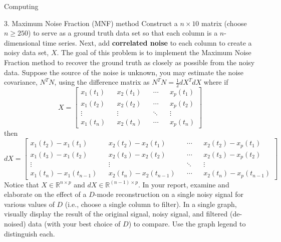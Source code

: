 \begin{section}{Computing}
\newpage
\begin{homeworkSection}{3. Maximum Noise Fraction (MNF) method}
Construct a $n \times 10$ matrix (choose $n \geq 250$) to serve as a ground truth data set so that each column is a
$n$-dimensional time series. Next, add \textbf{correlated noise} to each column to create a noisy data set, $X$. The
goal of this problem is to implement the Maximum Noise Fraction method to recover the ground truth as
closely as possible from the noisy data. Suppose the source of the noise is unknown, you may estimate
the noise covariance, $N^TN$, using the difference matrix as $N^T N = \frac{1}{2} dX^TdX$ where if
$$
    X = \begin{bmatrix}
        x_1(t_1)  &&  x_2(t_1) && \cdots && x_p(t_1) \\
        x_1(t_2)  &&  x_2(t_2) && \cdots && x_p(t_2) \\
        \vdots    && \vdots    && \ddots && \vdots \\
        x_1(t_n)  &&  x_2(t_n) && \cdots && x_p(t_n)
    \end{bmatrix}
$$
then
$$
    dX = \begin{bmatrix}
        x_1(t_2)-x_1(t_1)  &&  x_2(t_2)-x_2(t_1) && \cdots && x_2(t_2) - x_p(t_1) \\
        x_1(t_3)-x_1(t_2)  &&  x_2(t_3)-x_2(t_2) && \cdots && x_2(t_3) - x_p(t_2) \\
        \vdots    && \vdots    && \ddots && \vdots \\
        x_1(t_n)-x_1(t_{n-1})  &&  x_2(t_n)-x_2(t_{n-1}) && \cdots && x_2(t_n) - x_p(t_{n-1})
    \end{bmatrix}
$$
Notice that $X \in \mathbb{R}^{n \times p}$ and $dX \in \mathbb{R}^{(n-1) \times p}$.
In your report, examine and elaborate on the effect of a $D$-mode
reconstruction on a single noisy signal for various values of $D$ (i.e., choose a single column to filter). In a single graph, visually display the result of the original signal, noisy signal, and filtered (de-noised) data
(with your best choice of $D$) to compare. Use the graph legend to distinguish each.
\\
\\
\end{homeworkSection}
\end{section}
